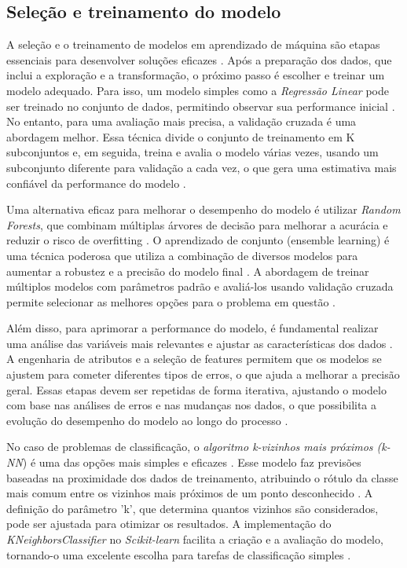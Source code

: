 \subsection{Seleção e treinamento do modelo}
A seleção e o treinamento de modelos em aprendizado de máquina são etapas essenciais para desenvolver soluções eficazes \cite{geron2017}. Após a preparação dos dados, que inclui a exploração e a transformação, o próximo passo é escolher e treinar um modelo adequado. Para isso, um modelo simples como a \textit{Regressão Linear} pode ser treinado no conjunto de dados, permitindo observar sua performance inicial \cite{geron2017}. No entanto, para uma avaliação mais precisa, a validação cruzada é uma abordagem melhor. Essa técnica divide o conjunto de treinamento em K subconjuntos e, em seguida, treina e avalia o modelo várias vezes, usando um subconjunto diferente para validação a cada vez, o que gera uma estimativa mais confiável da performance do modelo \cite{geron2017}.

Uma alternativa eficaz para melhorar o desempenho do modelo é utilizar \textit{Random Forests}, que combinam múltiplas árvores de decisão para melhorar a acurácia e reduzir o risco de overfitting \cite{geron2017}. O aprendizado de conjunto (ensemble learning) é uma técnica poderosa que utiliza a combinação de diversos modelos para aumentar a robustez e a precisão do modelo final \cite{geron2017}. A abordagem de treinar múltiplos modelos com parâmetros padrão e avaliá-los usando validação cruzada permite selecionar as melhores opções para o problema em questão \cite{geron2017}.

Além disso, para aprimorar a performance do modelo, é fundamental realizar uma análise das variáveis mais relevantes e ajustar as características dos dados \cite{geron2017}. A engenharia de atributos e a seleção de features permitem que os modelos se ajustem para cometer diferentes tipos de erros, o que ajuda a melhorar a precisão geral. Essas etapas devem ser repetidas de forma iterativa, ajustando o modelo com base nas análises de erros e nas mudanças nos dados, o que possibilita a evolução do desempenho do modelo ao longo do processo \cite{geron2017}.

No caso de problemas de classificação, o \textit{algoritmo k-vizinhos mais próximos (k-NN}) é uma das opções mais simples e eficazes \cite{muller2017}. Esse modelo faz previsões baseadas na proximidade dos dados de treinamento, atribuindo o rótulo da classe mais comum entre os vizinhos mais próximos de um ponto desconhecido \cite{muller2017}. A definição do parâmetro 'k', que determina quantos vizinhos são considerados, pode ser ajustada para otimizar os resultados. A implementação do \textit{KNeighborsClassifier} no \textit{Scikit-learn} facilita a criação e a avaliação do modelo, tornando-o uma excelente escolha para tarefas de classificação simples \cite{muller2017}.

